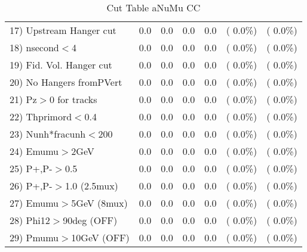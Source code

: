 \begin{table}[h!]
\begin{tabular}{||l||r|r|r|r|r|r||}
 17) Upstream Hanger cut  &          0.0 &          0.0 &          0.0 &          0.0 & (  0.0\%) & (  0.0\%) \\
 18) nsecond$<$4          &          0.0 &          0.0 &          0.0 &          0.0 & (  0.0\%) & (  0.0\%) \\
 19) Fid. Vol. Hanger cut &          0.0 &          0.0 &          0.0 &          0.0 & (  0.0\%) & (  0.0\%) \\
 20) No Hangers fromPVert &          0.0 &          0.0 &          0.0 &          0.0 & (  0.0\%) & (  0.0\%) \\
 21) Pz$>$0 for tracks    &          0.0 &          0.0 &          0.0 &          0.0 & (  0.0\%) & (  0.0\%) \\
 22) Thprimord$<$0.4      &          0.0 &          0.0 &          0.0 &          0.0 & (  0.0\%) & (  0.0\%) \\
 23) Nunh*fracunh$<$200   &          0.0 &          0.0 &          0.0 &          0.0 & (  0.0\%) & (  0.0\%) \\
 24) Emumu$>$2GeV         &          0.0 &          0.0 &          0.0 &          0.0 & (  0.0\%) & (  0.0\%) \\
 25) P+,P-$>$0.5          &          0.0 &          0.0 &          0.0 &          0.0 & (  0.0\%) & (  0.0\%) \\
 26) P+,P-$>$1.0 (2.5mux) &          0.0 &          0.0 &          0.0 &          0.0 & (  0.0\%) & (  0.0\%) \\
 27) Emumu$>$5GeV  (8mux) &          0.0 &          0.0 &          0.0 &          0.0 & (  0.0\%) & (  0.0\%) \\
 28) Phi12$>$90deg  (OFF) &          0.0 &          0.0 &          0.0 &          0.0 & (  0.0\%) & (  0.0\%) \\
 29) Pmumu$>$10GeV  (OFF) &          0.0 &          0.0 &          0.0 &          0.0 & (  0.0\%) & (  0.0\%) \\
 \hline
 \hline
 \end{tabular}
 \caption{Cut Table  aNuMu CC }
 \label{tab-cutcohjpsi-mumu_res}
 \end{table}
